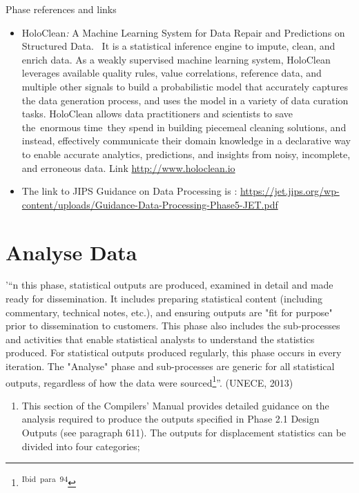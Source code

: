 \documentclass[
]{article}
\providecommand{\tightlist}{%
  \setlength{\itemsep}{0pt}\setlength{\parskip}{0pt}}
\begin{document}
Phase references and links

\begin{itemize}
\item
  HoloClean\emph{:} A Machine Learning System for Data Repair and
  Predictions on Structured Data. ~It is a statistical inference
  engine to impute, clean, and enrich data. As a weakly supervised
  machine learning system, HoloClean leverages available quality
  rules, value correlations, reference data, and multiple other
  signals to build a probabilistic model that accurately captures the
  data generation process, and uses the model in a variety of data
  curation tasks. HoloClean allows data practitioners and scientists
  to save the~enormous time~they spend in building piecemeal cleaning
  solutions, and instead, effectively communicate their domain
  knowledge in a declarative way to enable accurate analytics,
  predictions, and insights from noisy, incomplete, and erroneous
  data. Link \href{http://www.holoclean.io/}{http://www.holoclean.io}
\item
  The link to JIPS Guidance on Data Processing is : {}
  \url{https://jet.jips.org/wp-content/uploads/Guidance-Data-Processing-Phase5-JET.pdf}
\end{itemize}

\hypertarget{analyse-data}{%
\section{Analyse Data}\label{analyse-data}}

'``n this phase, statistical outputs are produced, examined in detail and
made ready for dissemination. It includes preparing statistical content
(including commentary, technical notes, etc.), and ensuring outputs are
"fit for purpose" prior to dissemination to customers. This phase also
includes the sub-processes and activities that enable statistical
analysts to understand the statistics produced. For statistical outputs
produced regularly, this phase occurs in every iteration. The
"Analyse" phase and sub-processes are generic for all statistical
outputs, regardless of how the data were sourced\footnote{\textsuperscript{Ibid~para~94}}''. (UNECE, 2013)

\begin{enumerate}
\def\labelenumi{\arabic{enumi}.}
\setcounter{enumi}{395}
\tightlist
\item
  This section of the Compilers' Manual provides detailed guidance on
  the analysis required to produce the outputs specified in Phase 2.1
  Design Outputs (see paragraph 611). The outputs for displacement
  statistics can be divided into four categories;
\end{enumerate}
\end{document}
